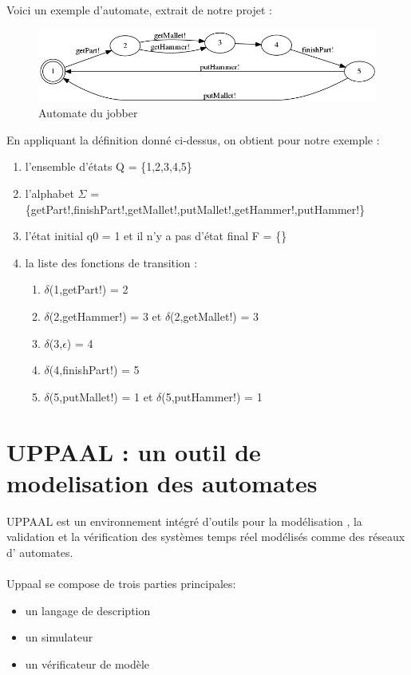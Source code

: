 \documentclass[12pt,a4paper]{report}
\begin{document}
    Voici un exemple d'automate, extrait de notre projet :\\

\begin{figure}[h]
	\centering
	\includegraphics[scale=0.5]{ressources/img.png}
	\caption{Automate du jobber}
\end{figure}
  
    En appliquant la définition donné ci-dessus, on obtient pour notre exemple :
\begin{enumerate}
  \item l'ensemble d'états Q = \{1,2,3,4,5\}
  \item l'alphabet $\Sigma$ = \{getPart!,finishPart!,getMallet!,putMallet!,getHammer!,putHammer!\}
  \item l'état initial q0 = 1 et il n'y a pas d'état final F = \{\}
  \item la liste des fonctions de transition : 
  \begin{enumerate}
    \item $\delta$(1,getPart!) = 2 
    \item $\delta$(2,getHammer!) = 3 et $\delta$(2,getMallet!) = 3 
    \item $\delta$(3,$\epsilon$) = 4 
    \item $\delta$(4,finishPart!) = 5 
    \item $\delta$(5,putMallet!) = 1 et $\delta$(5,putHammer!) = 1 
  \end{enumerate}
\end{enumerate}

\section{UPPAAL : un outil de modelisation des automates}
UPPAAL est un environnement intégré d'outils pour la modélisation , la validation et la vérification des systèmes temps réel modélisés comme des réseaux d' automates.
\\\\
Uppaal se compose de trois parties principales: 
\begin{itemize}[label=$\circ$]
  \item{ un langage de description}
  \item{ un simulateur}
  \item{ un vérificateur de modèle}
\end{itemize} 
\end{document}
